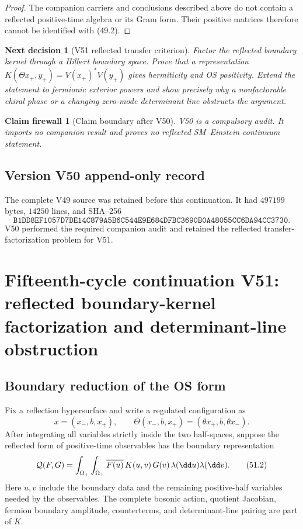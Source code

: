 \documentclass[11pt]{article}
\newtheorem{firewall}[theorem]{Claim firewall}
\newtheorem{decision}[theorem]{Next decision}
\theoremstyle{remark}
\begin{document}
\begin{proof}
The companion carriers and conclusions described above do not
contain a reflected positive-time algebra or its Gram form.  Their
positive matrices therefore cannot be identified with (49.2).
\end{proof}

\begin{decision}[V51 reflected transfer criterion]
\label{dec:v15v50-next}
Factor the reflected boundary kernel through a Hilbert boundary
space.  Prove that a representation
\(K(\Theta x_+,y_+)=V(x_+)^*V(y_+)\) gives hermiticity and OS
positivity.  Extend the statement to fermionic exterior powers and
show precisely why a nonfactorable chiral phase or a changing
zero-mode determinant line obstructs the argument.
\end{decision}

\begin{firewall}[Claim boundary after V50]
\label{fire:v15v50}
V50 is a compulsory audit.  It imports no companion result and
proves no reflected SM--Einstein continuum statement.
\end{firewall}

\section*{Version V50 append-only record}
The complete V49 source was retained before this continuation.  It
had \(497199\) bytes, \(14250\) lines, and SHA--256
\[
 \texttt{B1DD8EF1057D7DE14C879A5B6C544E9E684DFBC3690B0A48055CC6DA94CC3730}.
\]
V50 performed the required companion audit and retained the
reflected transfer-factorization problem for V51.

\chapter{Fifteenth-cycle continuation V51: reflected boundary-kernel factorization and determinant-line obstruction}
\label{sec:v15v51}

\section{Boundary reduction of the OS form}

Fix a reflection hypersurface and write a regulated configuration as
\[
 x=(x_-,b,x_+),\qquad
 \Theta(x_-,b,x_+)=(\theta x_+,b,\theta x_-).            \tag{51.1}
\]
After integrating all variables strictly inside the two half-spaces,
suppose the reflected form of positive-time observables has the
boundary representation
\[
 {\cal Q}(F,G)=
 \int_{\Omega_+}\int_{\Omega_+}
 \overline{F(u)}\,K(u,v)\,G(v)\,
 \lambda(\dd u)\lambda(\dd v).                          \tag{51.2}
\]
Here \(u,v\) include the boundary data and the remaining
positive-half variables needed by the observables.  The complete
bosonic action, quotient Jacobian, fermion boundary amplitude,
counterterms, and determinant-line pairing are part of \(K\).
\end{document}
